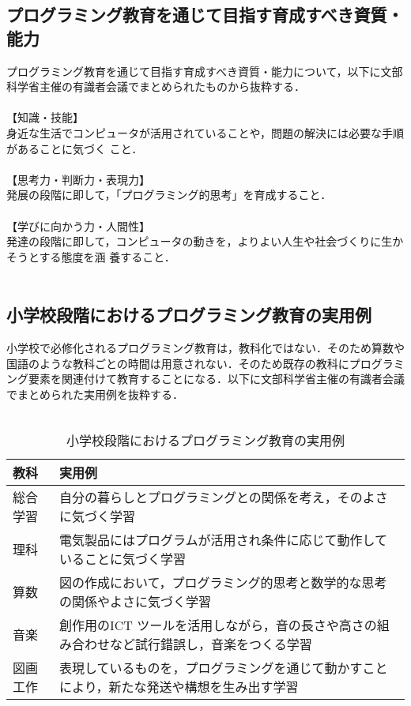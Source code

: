 \subsection{プログラミング教育を通じて目指す育成すべき資質・能力}
プログラミング教育を通じて目指す育成すべき資質・能力について，以下に文部科学省主催の有識者会議でまとめられたものから抜粋する．\\
\\
【知識・技能】\\
身近な生活でコンピュータが活用されていることや，問題の解決には必要な手順があることに気づく
こと．\\
\\
【思考力・判断力・表現力】\\
発展の段階に即して，「プログラミング的思考」を育成すること．\\
\\
【学びに向かう力・人間性】\\
発達の段階に即して，コンピュータの動きを，よりよい人生や社会づくりに生かそうとする態度を涵
養すること．\\
\\

\subsection{小学校段階におけるプログラミング教育の実用例}
小学校で必修化されるプログラミング教育は，教科化ではない．そのため算数や国語のような教科ごとの時間は用意されない．そのため既存の教科にプログラミング要素を関連付けて教育することになる．以下に文部科学省主催の有識者会議でまとめられた実用例を抜粋する．\\\\

\begin{table}[htb]
    \caption{小学校段階におけるプログラミング教育の実用例}
  \begin{tabularx}{\linewidth}{|X|X|} \hline
    教科& 実用例 \\ \hline
    総合学習& 自分の暮らしとプログラミングとの関係を考え，そのよさに気づく学習 \\ \hline
    理科&電気製品にはプログラムが活用され条件に応じて動作していることに気づく学習\\ \hline
    算数 & 図の作成において，プログラミング的思考と数学的な思考の関係やよさに気づく学習\\ \hline
    音楽 & 創作用のICT ツールを活用しながら，音の長さや高さの組み合わせなど試行錯誤し，音楽をつくる学習\\ \hline
    図画工作 & 表現しているものを，プログラミングを通じて動かすことにより，新たな発送や構想を生み出す学習\\ \hline
   
  \end{tabularx}

  \end{table}
\newpage


